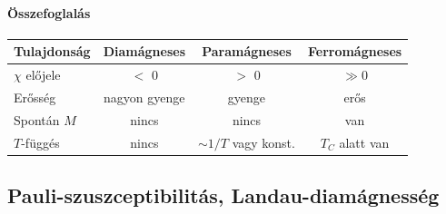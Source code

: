 \documentclass[../main.tex]{subfiles}
\begin{document}
\paragraph{Összefoglalás}
\begin{center}
\begin{tabular}{lccc}
\hline
Tulajdonság & Diamágneses & Paramágneses & Ferromágneses \\
\hline
$\chi$ előjele & $<$ 0 & $>$ 0 & $\gg 0$ \\
Erősség & nagyon gyenge & gyenge & erős \\
Spontán $M$ & nincs & nincs & van \\
$T$-függés & nincs & $\sim 1/T$ vagy konst. & $T_C$ alatt van \\
\hline
\end{tabular}
\end{center}


\subsection{Pauli-szuszceptibilitás, Landau-diamágnesség}
\end{document}
